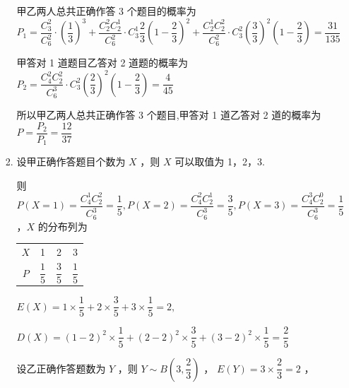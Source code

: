 \begin{enumerate}
\begin{enumerate}
\begin{jieda}
\begin{enumerate}
                甲乙两人总共正确作答 3 个题目的概率为 ${P}_{1} = \dfrac{C_{3}^{2}}{C_{6}^{2}} \cdot  {\left( \dfrac{1}{3}\right) }^{3} + \dfrac{C_{2}^{2}C_{2}^{1}}{C_{6}^{2}} \cdot  C_{3}^{1}\dfrac{2}{3}{\left( 1 - \dfrac{2}{3}\right) }^{2} + \dfrac{C_{2}^{1}C_{2}^{2}}{C_{6}^{2}} \cdot  C_{3}^{2}{\left( \dfrac{3}{3}\right) }^{2}\left( {1 - \dfrac{2}{3}}\right)  = \dfrac{31}{135}$
                
                甲答对 1 道题目乙答对 2 道题的概率为 ${P}_{2} = \dfrac{C_{4}^{2}C_{2}^{2}}{C_{6}^{3}} \cdot  C_{3}^{2}{\left( \dfrac{2}{3}\right) }^{2}\left( {1 - \dfrac{2}{3}}\right)  = \dfrac{4}{45}$
                
                所以甲乙两人总共正确作答 3 个题目,甲答对 1 道乙答对 2 道的概率为 $P = \dfrac{{P}_{2}}{{P}_{1}} = \dfrac{12}{37}$
                \item 设甲正确作答题目个数为 $X$ ，则 $X$ 可以取值为 1，2，3.
                
                则 $P\left( {X = 1}\right)  = \dfrac{C_{4}^{1}C_{2}^{2}}{C_{6}^{3}} = \dfrac{1}{5},P\left( {X = 2}\right)  = \dfrac{C_{4}^{2}C_{2}^{1}}{C_{6}^{3}} = \dfrac{3}{5},P\left( {X = 3}\right)  = \dfrac{C_{4}^{3}C_{2}^{0}}{C_{6}^{3}} = \dfrac{1}{5}$ ，$X$ 的分布列为
                
                \begin{center}
                
                \begin{tabular}{|c|c|c|c|}
                \hline
                $X$ & 1 & 2 & 3 \\
                \cline{1-4}
                $P$ & $\dfrac{1}{5}$ & $\dfrac{3}{5}$ & $\dfrac{1}{5}$ \\
                \cline{1-4}
                \hline
                \end{tabular}
                
                \end{center}
                
                $E\left( X\right)  = 1 \times  \dfrac{1}{5} + 2 \times  \dfrac{3}{5} + 3 \times  \dfrac{1}{5} = 2,$
                
                $D\left( X\right)  = {\left( 1 - 2\right) }^{2} \times  \dfrac{1}{5} + {\left( 2 - 2\right) }^{2} \times  \dfrac{3}{5} + {\left( 3 - 2\right) }^{2} \times  \dfrac{1}{5} = \dfrac{2}{5}$
                
                设乙正确作答题数为 $Y$ ，则 $Y \sim  B\left( {3,\dfrac{2}{3}}\right)$ ， $E\left( Y\right)  = 3 \times  \dfrac{2}{3} = 2$ ，
                

\end{enumerate}
\end{jieda}
\end{enumerate}
\end{enumerate}
